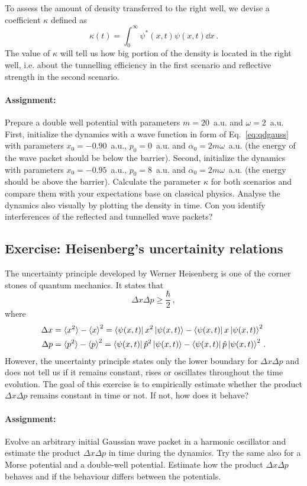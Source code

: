 To assess the amount of density transferred to the right well, we devise a coefficient $\kappa$ defined as
\begin{equation*}
    \kappa(t) = \int_0^{\infty} \psi^*(x,t) \psi(x,t) \dd x \,.
\end{equation*}
The value of $\kappa$ will tell us how big portion of the density is located in the right well, i.e. about the tunnelling efficiency in the first scenario and reflective strength in the second scenario.

\paragraph{Assignment:} Prepare a double well potential with parameters $m=20$~a.u. and $\omega=2$~a.u. First, initialize the dynamics with a wave function in form of Eq.~\eqref{eq:qdgauss} with parameters $x_0=-0.90$~a.u., $p_0=0$~a.u. and $\alpha_0 = 2m\omega$~a.u. (the energy of the wave packet should be below the barrier). Second, initialize the dynamics with parameters $x_0=-0.95$~a.u., $p_0=8$~a.u. and $\alpha_0=2m\omega$~a.u. (the energy should be above the barrier). Calculate the parameter $\kappa$ for both scenarios and compare them with your expectations base on classical physics. Analyse the dynamics also visually by plotting the density in time. Con you identify interferences of the reflected and tunnelled wave packets?

\subsection*{Exercise: Heisenberg's uncertainity relations}

The uncertainty principle developed by Werner Heisenberg is one of the corner stones of quantum mechanics. It states that
\begin{equation}
    \Delta x \Delta p \ge \frac{\hbar}{2} \, , 
\end{equation}
where
\begin{align}
    \Delta x &= \braket{x^2} - \braket{x}^2 = \bra{\psi(x, t)}x^2\ket{\psi(x,t)} -  \bra{\psi(x, t)}x\ket{\psi(x,t)}^2\\
    \Delta p &= \braket{p^2} - \braket{p}^2 = \bra{\psi(x, t)}\hat{p}^2\ket{\psi(x,t)} -  \bra{\psi(x, t)}\hat{p}\ket{\psi(x,t)}^2 \, .
\end{align}
However, the uncertainty principle states only the lower boundary for $\Delta x \Delta p$ and does not tell us if it remains constant, rises or oscillates throughout the time evolution. The goal of this exercise is to empirically estimate whether the product $ \Delta x \Delta p$ remains constant in time or not. If not, how does it behave?

\paragraph{Assignment:} Evolve an arbitrary initial Gaussian wave packet in a harmonic oscillator and estimate the product $\Delta x \Delta p$ in time during the dynamics. Try the same also for a Morse potential and a double-well potential. Estimate how the product $\Delta x \Delta p$ behaves and if the behaviour differs between the potentials.